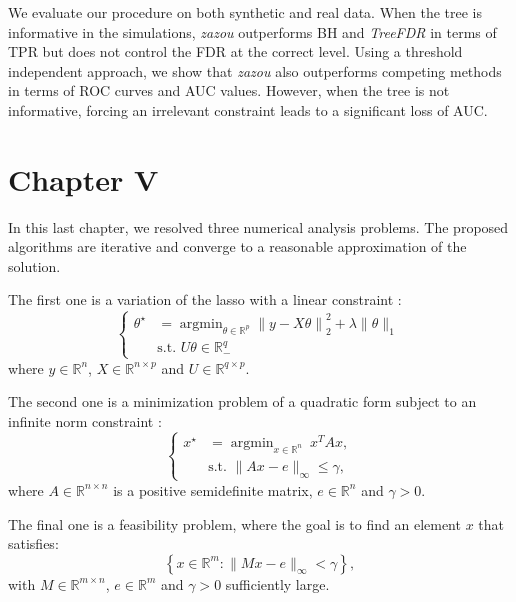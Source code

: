 \documentclass[12pt,a4paper]{reedthesis}
\newcommand \RR {\mathbb{R}}
\newcommand \param {\theta}
\DeclareMathOperator*{\argmin}{argmin}
\theoremstyle{definition}
\theoremstyle{definition}
\theoremstyle{definition}
\theoremstyle{remark}
\begin{document}
We evaluate our procedure on both synthetic and real data. When the tree is informative in the simulations, \emph{zazou} outperforms BH and \emph{TreeFDR} in terms of TPR but does not control the FDR at the correct level. Using a threshold independent approach, we show that \emph{zazou} also outperforms competing methods in terms of ROC curves and AUC values. However, when the tree is not informative, forcing an irrelevant constraint leads to a significant loss of AUC.

\hypertarget{chapter-v}{%
\section*{Chapter V}\label{chapter-v}}

In this last chapter, we resolved three numerical analysis problems. The proposed algorithms are iterative and converge to a reasonable approximation of the solution.

The first one is a variation of the lasso with a linear constraint :
\begin{equation*}
\left\{
  \begin{aligned}
  \param^\star & = \argmin_{\param \in \RR^p} \left\|y - X\param\right\|_2^2 + \lambda \|\param\|_1 \\
        & \text{s.t. } U\param \in \RR^q_{-}
  \end{aligned}
\right.
\end{equation*}
where \(y \in \RR^n\), \(X \in \RR^{n\times p}\) and \(U \in \RR^{q \times p}\).

The second one is a minimization problem of a quadratic form subject to an infinite norm constraint :
\begin{equation*}
\left\{
  \begin{aligned}
    x^\star & = \argmin_{x \in \mathbb{R}^{n}} \ x^TAx, \\
    &\text{s.t. }\|Ax - e\|_{\infty} \leq \gamma,
  \end{aligned}
\right.
\end{equation*}
where \(A \in \RR^{n\times n}\) is a positive semidefinite matrix, \(e\in \RR^n\) and \(\gamma > 0\).

The final one is a feasibility problem, where the goal is to find an element \(x\) that satisfies:
\begin{equation*}
\left\{x \in \RR^m : \|Mx-e\|_{\infty} < \gamma\right\},
\end{equation*}
with \(M \in \RR^{m\times n}\), \(e \in \RR^m\) and \(\gamma > 0\) sufficiently large.
\end{document}
